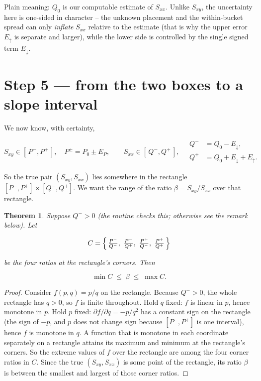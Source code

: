 \documentclass[11pt]{article}
\newtheorem{theorem}{Theorem}
\begin{document}
\noindent Plain meaning: $Q_0$ is our computable estimate of $S_{xx}$.
Unlike $S_{xy}$, the uncertainty here is one-sided in character -- the
unknown placement and the within-bucket spread can only \emph{inflate}
$S_{xx}$ relative to the estimate (that is why the upper error
$E_\uparrow$ is separate and larger), while the lower side is
controlled by the single signed term $E_\downarrow$.

\section{Step 5 --- from the two boxes to a slope interval}

We now know, with certainty,

\[
S_{xy}\in[\,P^-,P^+\,],\quad P^\pm=P_0\pm E_P,
\qquad
S_{xx}\in[\,Q^-,Q^+\,],\quad
\begin{aligned}
Q^-&=Q_0-E_\downarrow,\\
Q^+&=Q_0+E_\downarrow+E_\uparrow.
\end{aligned}
\]

So the true pair $(S_{xy},S_{xx})$ lies somewhere in the rectangle
$[P^-,P^+]\times[Q^-,Q^+]$. We want the range of the ratio
$\beta=S_{xy}/S_{xx}$ over that rectangle.

\begin{theorem}
Suppose $Q^->0$ (the routine checks this; otherwise see the remark
below). Let

\[
C=\Bigl\{\,\tfrac{P^-}{Q^-},\ \tfrac{P^-}{Q^+},\
            \tfrac{P^+}{Q^-},\ \tfrac{P^+}{Q^+}\,\Bigr\}
\]

be the four ratios at the rectangle's corners. Then

\[
\min C\;\le\;\beta\;\le\;\max C.
\]
\end{theorem}

\begin{proof}
Consider $f(p,q)=p/q$ on the rectangle. Because $Q^->0$, the whole
rectangle has $q>0$, so $f$ is finite throughout. Hold $q$ fixed:
$f$ is linear in $p$, hence monotone in $p$. Hold $p$ fixed:
$\partial f/\partial q=-p/q^2$ has a constant sign on the rectangle
(the sign of $-p$, and $p$ does not change sign because $[P^-,P^+]$ is
one interval), hence $f$ is monotone in $q$. A function that is
monotone in each coordinate separately on a rectangle attains its
maximum and minimum at the rectangle's corners. So the extreme values
of $f$ over the rectangle are among the four corner ratios in $C$.
Since the true $(S_{xy},S_{xx})$ is some point of the rectangle, its
ratio $\beta$ is between the smallest and largest of those corner
ratios.
\end{proof}
\end{document}
